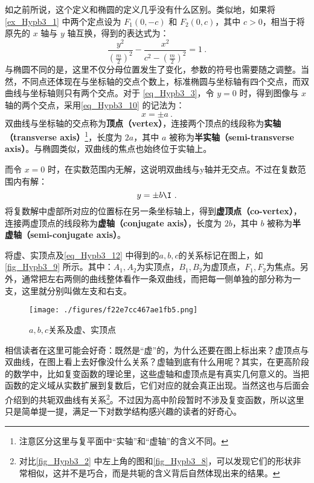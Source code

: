 如之前所说，这个定义和椭圆的定义几乎没有什么区别。类似地，如果将 \autoref{ex_Hypb3_1} 中两个定点设为 $F_1(0,-c)$ 和 $F_2(0,c)$，其中 $c>0$，相当于将原先的 $x$ 轴与 $y$ 轴互换，得到的表达式为：
\begin{equation}\label{eq_Hypb3_7}
\frac{y^2}{\left(\displaystyle\frac{m}{2}\right)^2}-\frac{x^2}{\displaystyle c^2-\left(\frac{m}{2}\right)^2} =1~.
\end{equation}
与椭圆不同的是，这里不仅分母位置发生了变化，参数的符号也需要随之调整。当然，不同点还体现在与坐标轴的交点个数上，标准椭圆与坐标轴有四个交点，而双曲线与坐标轴则只有两个交点。对于 \autoref{eq_Hypb3_3}，令 $y=0$ 时，得到图像与 $x$ 轴的两个交点，采用\autoref{eq_Hypb3_10} 的记法为：
\begin{equation}
x = \pm a~.
\end{equation}
双曲线与坐标轴的交点称为\textbf{顶点（vertex）}，连接两个顶点的线段称为\textbf{实轴（transverse axis）}\footnote{注意区分这里与复平面中“实轴”和“虚轴”的含义不同。}，长度为 $2a$，其中 $a$ 被称为\textbf{半实轴（semi-transverse axis）}。与椭圆类似，双曲线的焦点也始终位于实轴上。

而令 $x=0$ 时，在实数范围内无解，这说明双曲线与y轴并无交点。不过在复数范围内有解：
\begin{equation}
y = \pm  b\I~.
\end{equation}
将复数解中虚部所对应的位置标在另一条坐标轴上，得到\textbf{虚顶点（co-vertex）}，连接两虚顶点的线段称为\textbf{虚轴（conjugate axis）}，长度为 $2b$，其中 $b$ 被称为\textbf{半虚轴（semi-conjugate axis）}。

将虚、实顶点及\autoref{eq_Hypb3_12} 中得到的$a,b,c$的关系标记在图上，如\autoref{fig_Hypb3_9} 所示。其中：$A_1,A_2$为实顶点，$B_1,B_2$为虚顶点，$F_1,F_2$为焦点。另外，通常把左右两侧的曲线整体看作一条双曲线，而把每一侧单独的部分称为一支，这里就分别叫做左支和右支。
\begin{figure}[ht]
\centering
\texttt{[image: ./figures/f22e7cc467ae1fb5.png]}
\caption{$a,b,c$关系及虚、实顶点} \label{fig_Hypb3_9}
\end{figure}

相信读者在这里可能会好奇：既然是“虚”的，为什么还要在图上标出来？虚顶点与双曲线，在图上看上去好像没什么关系？虚轴到底有什么用呢？其实，在更高阶段的数学中，比如复变函数的理论里，这些虚轴和虚顶点是有真实几何意义的。当把函数的定义域从实数扩展到复数后，它们对应的就会真正出现。当然这也与后面会介绍到的共轭双曲线有关系\footnote{对比\autoref{fig_Hypb3_2} 中左上角的图和\autoref{fig_Hypb3_8}，可以发现它们的形状非常相似，这并不是巧合，而是共轭的含义背后自然体现出来的结果。}。不过因为高中阶段暂时不涉及复变函数，所以这里只是简单提一提，满足一下对数学结构感兴趣的读者的好奇心。

